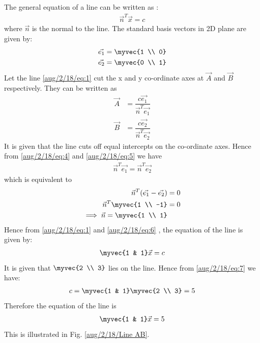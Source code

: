 
The general equation of a line can be written as :
\begin{align}
\vec{n}^T\vec{x}=c \label{aug/2/18/eq:1}  
\end{align}
where $\vec{n}$ is the normal to the line.
%
The standard basis vectors in 2D plane are given by:
\begin{align}
\vec{e_{1}} &= \myvec{1 \\ 0}\label{aug/2/18/eq:2}
\\\vec{e_{2}} &= \myvec{0 \\ 1}\label{aug/2/18/eq:3}
\end{align}
%
Let the line \eqref{aug/2/18/eq:1} cut the x and y co-ordinate axes at $\vec{A}$ and $\vec{B}$ respectively. They can be written as 
\begin{align}
\vec{A} &= \dfrac{c\vec{e_{1}}}{\vec{n}^T\vec{e_{1}}}\label{aug/2/18/eq:4}\\
\vec{B} &= \dfrac{c\vec{e_{2}}}{\vec{n}^T\vec{e_{2}}}\label{aug/2/18/eq:5}
\end{align}
%
It is given that the line cuts off equal intercepts on the co-ordinate axes. Hence from \eqref{aug/2/18/eq:4} and \eqref{aug/2/18/eq:5} we have
\begin{align}
\vec{n}^T\vec{e_{1}} = \vec{n}^T\vec{e_{2}}
\end{align}
%
which is equivalent to
\begin{align}
\vec{n}^T(\vec{e_{1}}-\vec{e_{2}}) &= 0\\
\vec{n}^T\myvec{1 \\ -1} &= 0\\
\implies \vec{n} = \myvec{1 \\ 1}\label{aug/2/18/eq:6}
\end{align}
%
Hence from \eqref{aug/2/18/eq:1} and \eqref{aug/2/18/eq:6} , the equation of the line is given by:
\begin{align}
\myvec{1 & 1}\vec{x}=c\label{aug/2/18/eq:7}
\end{align}
It is given that $\myvec{2 \\ 3}$ lies on the line. Hence from \eqref{aug/2/18/eq:7} we have:
\begin{align}
c =\myvec{1 & 1}\myvec{2 \\ 3} = 5
\end{align}
Therefore the equation of the line is
\begin{align}
\myvec{1 & 1}\vec{x}=5
\end{align}
This is illustrated in Fig.     \ref{aug/2/18/Line AB}.

